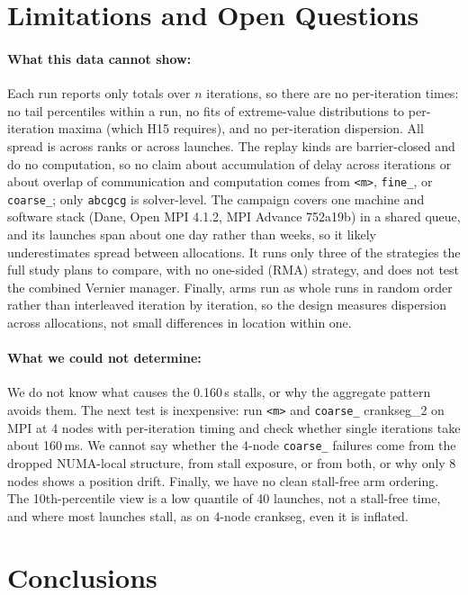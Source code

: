 \documentclass[11pt]{article}
\newcommand{\kM}{\texttt{<m>}}
\newcommand{\kF}{\texttt{fine\_}}
\newcommand{\kC}{\texttt{coarse\_}}
\newcommand{\cg}{\texttt{abcgcg}}
\begin{document}
\FloatBarrier
\section{Limitations and Open Questions}
\label{sec:limits}

\paragraph{What this data cannot show:} Each run reports only totals over $n$ iterations, so
there are no per-iteration times: no tail percentiles within a run, no fits of extreme-value
distributions to per-iteration maxima (which H15 requires), and no per-iteration
dispersion. All spread is across ranks or across launches. The replay kinds are
barrier-closed and do no computation, so no claim about accumulation of delay across
iterations or about overlap of communication and computation comes from \kM, \kF, or
\kC; only \cg{} is solver-level. The campaign covers one machine and software stack (Dane,
Open MPI 4.1.2, MPI Advance 752a19b) in a shared queue, and its launches span about one
day rather than weeks, so it likely underestimates spread between allocations. It runs
only three of the strategies the full study plans to compare, with no one-sided (RMA)
strategy, and does not test the combined Vernier manager. Finally, arms run as whole runs in random order rather than
interleaved iteration by iteration, so the design measures dispersion across allocations,
not small differences in location within one.

\paragraph{What we could not determine:} We do not know what causes the 0.160\,s stalls, or
why the aggregate pattern avoids them. The next test is inexpensive: run \kM{} and \kC{}
crankseg\_2 on MPI at 4 nodes with per-iteration timing and check whether single iterations
take about 160\,ms. We cannot say whether the 4-node \kC{} failures come from the dropped
NUMA-local structure, from stall exposure, or from both, or why only 8 nodes shows a
position drift. Finally, we have no clean stall-free arm ordering. The 10th-percentile view
is a low quantile of 40 launches, not a stall-free time, and where most launches stall, as
on 4-node crankseg, even it is inflated.

\section{Conclusions}
\label{sec:conclusion}
\end{document}
